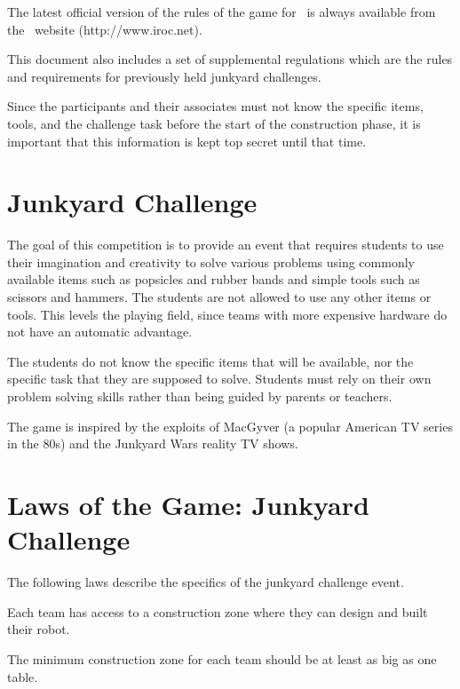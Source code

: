\documentclass[12pt]{hurocup}
\begin{document}
The latest official version of the rules of the game for \IROC\ is
always available from the \IROC\ website (http://www.iroc.net).

This document also includes a set of supplemental regulations which
are the rules and requirements for previously held junkyard
challenges.

Since the participants and their associates must not know the specific
items, tools, and the challenge task before the start of the
construction phase, it is important that this information is kept top
secret until that time.

\section{Junkyard Challenge}
\label{sec:junkyard-challenge} 

The goal of this competition is to provide an event that requires
students to use their imagination and creativity to solve various
problems using commonly available items such as popsicles and rubber
bands and simple tools such as scissors and hammers. The students are
not allowed to use any other items or tools. This levels the playing
field, since teams with more expensive hardware do not have an
automatic advantage.

The students do not know the specific items that will be available,
nor the specific task that they are supposed to solve. Students must
rely on their own problem solving skills rather than being guided by
parents or teachers.

The game is inspired by the exploits of MacGyver (a popular American TV
series in the 80s) and the Junkyard Wars reality TV shows.

\section{Laws of the Game: Junkyard Challenge}
\label{sec:laws-junkyard-challenge}

The following laws describe the specifics of the junkyard challenge
event.

\label{jc-team}

\begin{lawlist}[JC]

\item Each team has access to a construction zone where they can
  design and built their robot. 

\item The minimum construction zone for each team should be at least
  as big as one table.

\end{lawlist}
\end{document}
